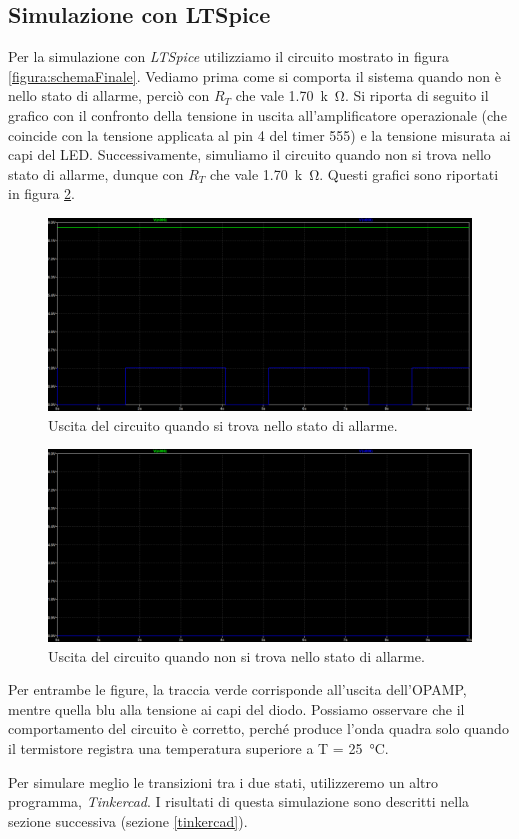 \documentclass{report}
\begin{document}
\subsection{Simulazione con LTSpice}
Per la simulazione con \textit{LTSpice} utilizziamo il circuito mostrato in figura \ref{figura:schemaFinale}. Vediamo prima come si comporta il sistema quando non è nello stato di allarme, perciò con $R_T$ che vale \SI{1.70}{k\ohm}. Si riporta di seguito il grafico con il confronto della tensione in uscita all'amplificatore operazionale (che coincide con la tensione applicata al pin 4 del timer 555) e la tensione misurata ai capi del LED. Successivamente, simuliamo il circuito quando non si trova nello stato di allarme, dunque con $R_T$ che vale \SI{1.70}{k\ohm}. Questi grafici sono riportati in figura \ref{figura:sistemaOFF}. \par
\begin{figure}[h!]
	\centering
	\includegraphics[width=\textwidth]{immagini/sistemaON}
	\caption{Uscita del circuito quando si trova nello stato di allarme.} 
	\label{figura:sistemaON}
\end{figure}
\begin{figure}[h!]
	\centering
	\includegraphics[width=\textwidth]{immagini/sistemaOFF}
	\caption{Uscita del circuito quando non si trova nello stato di allarme.} 
	\label{figura:sistemaOFF}
\end{figure}
Per entrambe le figure, la traccia verde corrisponde all'uscita dell'OPAMP, mentre quella blu alla tensione ai capi del diodo. Possiamo osservare che il comportamento del circuito è corretto, perché produce l'onda quadra solo quando il termistore registra una temperatura superiore a T = \SI{25}{\celsius}. \par
Per simulare meglio le transizioni tra i due stati, utilizzeremo un altro programma, \textit{Tinkercad}. I risultati di questa simulazione sono descritti nella sezione successiva (sezione \ref{tinkercad}). 
\end{document}
